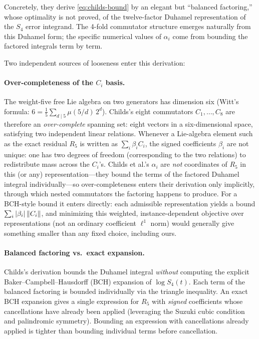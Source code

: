 Concretely, they derive \cref{eq:childs-bound} by an elegant but
``balanced factoring,'' whose optimality is not proved, of the twelve-factor Duhamel
representation of the $S_4$ error integrand. The 4-fold commutator structure
emerges naturally from this Duhamel form; the specific numerical values of
$\alpha_i$ come from bounding the factored integrals term by term.

Two independent sources of looseness enter this derivation:

\paragraph{Over-completeness of the $C_i$ basis.}
The weight-five free Lie algebra on two generators has dimension six (Witt's
formula: $6 = \tfrac{1}{5}\sum_{d \mid 5} \mu(5/d)\,2^d$). Childs's eight
commutators $C_1,\ldots,C_8$ are therefore an \emph{over-complete} spanning
set: eight vectors in a six-dimensional space, satisfying two independent
linear relations. Whenever a Lie-algebra element such as the exact residual
$R_5$ is written as $\sum_i \beta_i C_i$, the signed
coefficients $\beta_i$ are not unique: one has two degrees of freedom
(corresponding to the two relations) to redistribute mass across the $C_i$'s.
Childs et al.'s $\alpha_i$ are \emph{not} coordinates of $R_5$ in this (or
any) representation---they bound the terms of the factored Duhamel integral
individually---so over-completeness enters their derivation only implicitly,
through which nested commutators the factoring happens to produce. For a
BCH-style bound it enters directly: each admissible representation yields a
bound $\sum_i \left|\beta_i\right|\left\|C_i\right\|$, and minimizing this weighted,
instance-dependent objective over representations (not an ordinary
coefficient $\ell^1$ norm) would generally give something smaller than any
fixed choice, including ours.

\paragraph{Balanced factoring vs.\ exact expansion.}
Childs's derivation bounds the Duhamel integral \emph{without} computing the
explicit Baker--Campbell--Hausdorff (BCH) expansion of $\log S_4(t)$. Each
term of the balanced factoring is bounded individually via the triangle
inequality. An exact BCH expansion gives a single expression for $R_5$ with
\emph{signed} coefficients whose cancellations have already been applied
(leveraging the Suzuki cubic condition and palindromic symmetry). Bounding
an expression with cancellations already applied is tighter than bounding
individual terms before cancellation.

